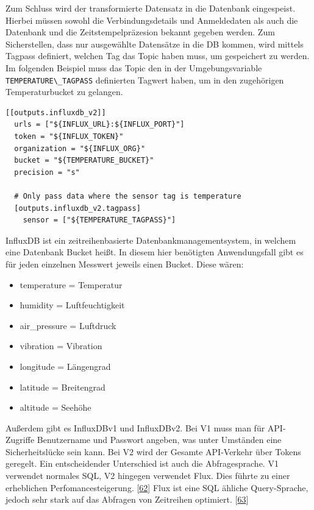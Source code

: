 \documentclass[
    headings=optiontotocandhead,%
    twoside,
    numbers=noenddot,%
    12pt, %
    titlepage, %
    parskip=full, %
    listof=leveldown, 
    numbers=noenddot, %
    a4paper,DIV=14,
    BCOR=15mm,
]{scrbook}
\newcommand{\passthrough}[1]{#1}
\providecommand{\tightlist}{%
  \setlength{\itemsep}{0pt}\setlength{\parskip}{0pt}}
\begin{document}
Zum Schluss wird der transformierte Datensatz in die Datenbank
eingespeist. Hierbei müssen sowohl die Verbindungsdetails und
Anmeldedaten als auch die Datenbank und die Zeitstempelpräzesion bekannt
gegeben werden. Zum Sicherstellen, dass nur ausgewählte Datensätze in
die DB kommen, wird mittels Tagpass definiert, welchen Tag das Topic
haben muss, um gespeichert zu werden. Im folgenden Beispiel muss das
Topic den in der Umgebungsvariable
\passthrough{\lstinline!TEMPERATURE\_TAGPASS!} definierten Tagwert
haben, um in den zugehörigen Temperaturbucket zu gelangen.

\begin{lstlisting}[caption={Persistieren der Messwerte in die Datenbank}]
[[outputs.influxdb_v2]]
  urls = ["${INFLUX_URL}:${INFLUX_PORT}"]
  token = "${INFLUX_TOKEN}"
  organization = "${INFLUX_ORG}"
  bucket = "${TEMPERATURE_BUCKET}"
  precision = "s"
  
  # Only pass data where the sensor tag is temperature
  [outputs.influxdb_v2.tagpass]
    sensor = ["${TEMPERATURE_TAGPASS}"]
\end{lstlisting}

InfluxDB ist ein zeitreihenbasierte Datenbankmanagementsystem, in
welchem eine Datenbank Bucket heißt. In diesem hier benötigten
Anwendungsfall gibt es für jeden einzelnen Messwert jeweils einen
Bucket. Diese wären:

\begin{itemize}
\tightlist
\item
  temperature = Temperatur
\item
  humidity = Luftfeuchtigkeit
\item
  air\_pressure = Luftdruck
\item
  vibration = Vibration
\item
  longitude = Längengrad
\item
  latitude = Breitengrad
\item
  altitude = Seehöhe
\end{itemize}

Außerdem gibt es InfluxDBv1 und InfluxDBv2. Bei V1 muss man für
API-Zugriffe Benutzername und Passwort angeben, was unter Umständen eine
Sicherheitslücke sein kann. Bei V2 wird der Gesamte API-Verkehr über
Tokens geregelt. Ein entscheidender Unterschied ist auch die
Abfragesprache. V1 verwendet normales SQL, V2 hingegen verwendet Flux.
Dies führte zu einer erheblichen Perfomancesteigerung.
{[}\protect\hyperlink{ref-influx-v1-vs-v2}{62}{]} Flux ist eine SQL
ähliche Query-Sprache, jedoch sehr stark auf das Abfragen von Zeitreihen
optimiert. {[}\protect\hyperlink{ref-flux}{63}{]}
\end{document}
